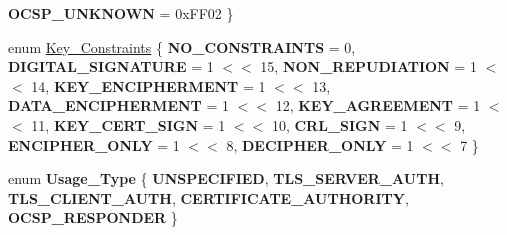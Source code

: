 \begin{DoxyCompactItemize}
{\bfseries O\+C\+S\+P\+\_\+\+U\+N\+K\+N\+O\+WN} = 0x\+F\+F02
 \}
\item 
enum \mbox{\hyperlink{namespace_botan_aed0885e5c70627dd43827b966e727654}{Key\+\_\+\+Constraints}} \{ \newline
{\bfseries N\+O\+\_\+\+C\+O\+N\+S\+T\+R\+A\+I\+N\+TS} = 0, 
{\bfseries D\+I\+G\+I\+T\+A\+L\+\_\+\+S\+I\+G\+N\+A\+T\+U\+RE} = 1 $<$$<$ 15, 
{\bfseries N\+O\+N\+\_\+\+R\+E\+P\+U\+D\+I\+A\+T\+I\+ON} = 1 $<$$<$ 14, 
{\bfseries K\+E\+Y\+\_\+\+E\+N\+C\+I\+P\+H\+E\+R\+M\+E\+NT} = 1 $<$$<$ 13, 
\newline
{\bfseries D\+A\+T\+A\+\_\+\+E\+N\+C\+I\+P\+H\+E\+R\+M\+E\+NT} = 1 $<$$<$ 12, 
{\bfseries K\+E\+Y\+\_\+\+A\+G\+R\+E\+E\+M\+E\+NT} = 1 $<$$<$ 11, 
{\bfseries K\+E\+Y\+\_\+\+C\+E\+R\+T\+\_\+\+S\+I\+GN} = 1 $<$$<$ 10, 
{\bfseries C\+R\+L\+\_\+\+S\+I\+GN} = 1 $<$$<$ 9, 
\newline
{\bfseries E\+N\+C\+I\+P\+H\+E\+R\+\_\+\+O\+N\+LY} = 1 $<$$<$ 8, 
{\bfseries D\+E\+C\+I\+P\+H\+E\+R\+\_\+\+O\+N\+LY} = 1 $<$$<$ 7
 \}
\item 
\mbox{\label{namespace_botan_aa9f60e06eee177e95f8b2fb017e0ecba}} 
enum {\bfseries Usage\+\_\+\+Type} \{ \newline
{\bfseries U\+N\+S\+P\+E\+C\+I\+F\+I\+ED}, 
{\bfseries T\+L\+S\+\_\+\+S\+E\+R\+V\+E\+R\+\_\+\+A\+U\+TH}, 
{\bfseries T\+L\+S\+\_\+\+C\+L\+I\+E\+N\+T\+\_\+\+A\+U\+TH}, 
{\bfseries C\+E\+R\+T\+I\+F\+I\+C\+A\+T\+E\+\_\+\+A\+U\+T\+H\+O\+R\+I\+TY}, 
\newline
{\bfseries O\+C\+S\+P\+\_\+\+R\+E\+S\+P\+O\+N\+D\+ER}
 \}
\end{DoxyCompactItemize}
